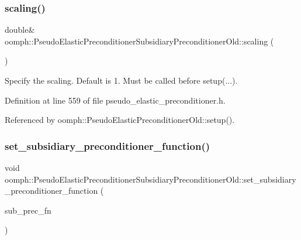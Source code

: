 \subsubsection{\texorpdfstring{scaling()}{scaling()}}
{\footnotesize\ttfamily double\& oomph\+::\+Pseudo\+Elastic\+Preconditioner\+Subsidiary\+Preconditioner\+Old\+::scaling (\begin{DoxyParamCaption}{ }\end{DoxyParamCaption})\hspace{0.3cm}{\ttfamily [inline]}}



Specify the scaling. Default is 1. Must be called before setup(...). 



Definition at line 559 of file pseudo\+\_\+elastic\+\_\+preconditioner.\+h.



Referenced by oomph\+::\+Pseudo\+Elastic\+Preconditioner\+Old\+::setup().

\mbox{\label{classoomph_1_1PseudoElasticPreconditionerSubsidiaryPreconditionerOld_a6fd50251d78370846929956b3eabf310}} 
\subsubsection{\texorpdfstring{set\+\_\+subsidiary\+\_\+preconditioner\+\_\+function()}{set\_subsidiary\_preconditioner\_function()}}
{\footnotesize\ttfamily void oomph\+::\+Pseudo\+Elastic\+Preconditioner\+Subsidiary\+Preconditioner\+Old\+::set\+\_\+subsidiary\+\_\+preconditioner\+\_\+function (\begin{DoxyParamCaption}\item[{\hyperlink{classoomph_1_1PseudoElasticPreconditionerSubsidiaryPreconditionerOld_a2ee5b7ddad26a4eb6662e2b701ab0a52}{Subsidiary\+Preconditioner\+Fct\+Pt}}]{sub\+\_\+prec\+\_\+fn }\end{DoxyParamCaption})\hspace{0.3cm}{\ttfamily [inline]}}



